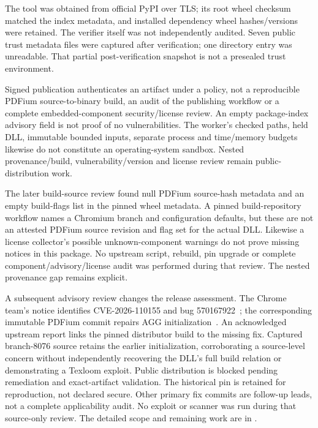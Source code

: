 The tool was obtained from official PyPI over TLS; its root wheel checksum
matched the index metadata, and installed dependency wheel hashes/versions
were retained. The verifier itself was not independently audited. Seven public
trust metadata files were captured after verification; one 
directory entry was unreadable. That partial post-verification snapshot is
not a presealed trust environment.

Signed publication authenticates an artifact under a policy, not a reproducible
PDFium source-to-binary build, an audit of the publishing workflow or a complete
embedded-component security/license review. An empty package-index advisory
field is not proof of no vulnerabilities. The worker's checked paths, held DLL,
immutable bounded inputs, separate process and time/memory budgets likewise
do not constitute an operating-system sandbox. Nested provenance/build,
vulnerability/version and license review remain public-distribution work.

The later build-source review found null PDFium source-hash metadata and an
empty build-flags list in the pinned wheel metadata. A pinned build-repository
workflow names a Chromium branch and configuration defaults, but these are
not an attested PDFium source revision and flag set for the actual DLL.
Likewise a license collector's possible unknown-component warnings do not
prove missing notices in this package. No upstream script, rebuild, pin
upgrade or complete component/advisory/license audit was performed during
that review. The nested provenance gap remains explicit.

A subsequent advisory review changes the release assessment. The Chrome
team's notice identifies CVE-2026-110155 and bug 570167922~\cite{chromepdfium2026advisory};
the corresponding immutable PDFium commit repairs AGG initialization~\cite{pdfiumagg2026fix}.
An acknowledged upstream report links the pinned distributor build to the
missing fix. Captured branch-8076 source retains the earlier initialization,
corroborating a source-level concern without independently recovering the
DLL's full build relation or demonstrating a Texloom exploit. Public
distribution is blocked pending remediation and exact-artifact validation.
The historical pin is retained for reproduction, not declared secure.
Other primary fix commits are follow-up leads, not a complete applicability
audit. No exploit or scanner was run during that source-only review. The detailed
scope and remaining work are in .

